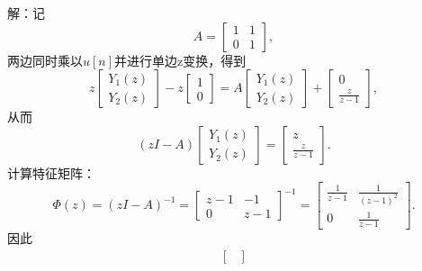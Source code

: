 \begin{example}
    解：记
    \begin{equation}
        A=\begin{bmatrix}
            1 & 1 \\
            0 & 1
        \end{bmatrix},
    \end{equation}
    两边同时乘以$u[n]$并进行单边z变换，得到
    \begin{equation}
        z\begin{bmatrix}
            Y_1(z) \\
            Y_2(z)
        \end{bmatrix}-z\begin{bmatrix}
            1 \\
            0
        \end{bmatrix}=A\begin{bmatrix}
            Y_1(z) \\
            Y_2(z)
        \end{bmatrix}+\begin{bmatrix}
            0 \\
            \frac{z}{z-1}
        \end{bmatrix},
    \end{equation}
    从而
    \begin{equation}
        (zI-A)\begin{bmatrix}
            Y_1(z) \\
            Y_2(z)
        \end{bmatrix}=\begin{bmatrix}
            z \\
            \frac{z}{z-1}
        \end{bmatrix}.
    \end{equation}
    计算特征矩阵：
    \begin{equation}
        \Phi(z)=(zI-A)^{-1}=\begin{bmatrix}
            z-1 & -1  \\
            0   & z-1
        \end{bmatrix}^{-1}=\begin{bmatrix}
            \frac{1}{z-1} & \frac{1}{(z-1)^2} \\
            0             & \frac{1}{z-1}
        \end{bmatrix}.
    \end{equation}
    因此
    \begin{align}
        \begin{bmatrix}

\end{bmatrix}
\end{align}
\end{example}
